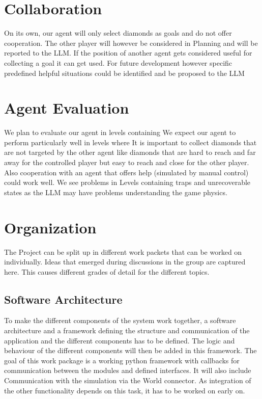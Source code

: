 \documentclass{article}
\begin{document}
\section{Collaboration}

On its own, our agent will only select diamonds as goals and do not offer cooperation. The other player will however be considered in Planning and will be reported to the LLM. If the position of another agent gets considered useful for collecting a goal it can get used. For future development however specific predefined helpful situations could be identified and be proposed to the LLM

\section{Agent Evaluation}

We plan to evaluate our agent in levels containing 
We expect our agent to perform particularly well in levels where It is important to collect diamonds that are not targeted by the other agent like diamonds that are hard to reach and far away for the controlled player but easy to reach and close for the other player. Also cooperation with an agent that offers help (simulated by manual control) could work well. We see problems in Levels containing traps and unrecoverable states as the LLM may have problems understanding the game physics.

\section{Organization}

The Project can be split up in different work packets that can be worked on individually.
Ideas that emerged during discussions in the group are captured here. This causes different grades of detail for the different topics.

\subsection{Software Architecture}
To make the different components of the system work together, a software architecture and a framework defining the structure and communication of the application and the different components has to be defined. 
The logic and behaviour of the different components will then be added in this framework. 
The goal of this work package is a working python framework with callbacks for communication between the modules and defined interfaces. 
It will also include Communication with the simulation via the World connector.
As integration of the other functionality depends on this task, it has to be worked on early on.
\end{document}
